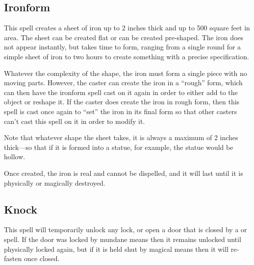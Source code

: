 \begin{multicols*}{2}
\subsection{Ironform}\label{spell:Ironform}


This spell creates a sheet of iron up to 2 inches thick and up to 500 square feet in area. The sheet can be created flat or can be created pre-shaped. The iron does not appear instantly, but takes time to form, ranging from a single round for a simple sheet of iron to two hours to create something with a precise specification.

Whatever the complexity of the shape, the iron must form a single piece with no moving parts. However, the caster can create the iron in a “rough” form, which can then have the ironform spell cast on it again in order to either add to the object or reshape it. If the caster does create the iron in rough form, then this spell is cast once again to “set” the iron in its final form so that other casters can’t cast this spell on it in order to modify it.

Note that whatever shape the sheet takes, it is always a maximum of 2 inches thick—so that if it is formed into a statue, for example, the statue would be hollow.

Once created, the iron is real and cannot be dispelled, and it will last until it is physically or magically destroyed.

\subsection{Knock}\label{spell:Knock}

This spell will temporarily unlock any lock, or open a door that is closed by a  or  spell. If the door was locked by mundane means then it remains unlocked until physically locked again, but if it is held shut by magical means then it will re-fasten once closed.


\end{multicols*}
